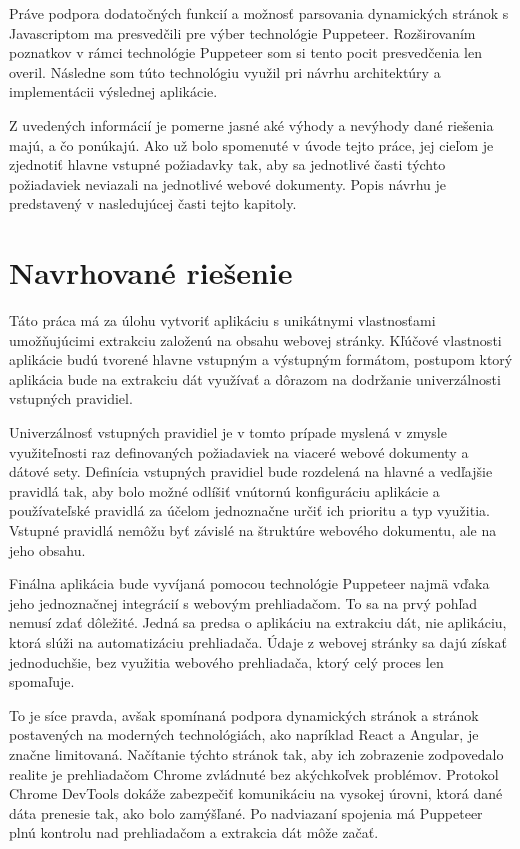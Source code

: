 Práve podpora dodatočných funkcií a možnosť parsovania dynamických stránok s Javascriptom ma presvedčili pre výber technológie Puppeteer. Rozširovaním poznatkov v rámci technológie Puppeteer som si tento pocit presvedčenia len overil. Následne som túto technológiu využil pri návrhu architektúry a implementácii výslednej aplikácie.

\bigskip

Z uvedených informácií je pomerne jasné aké výhody a nevýhody dané riešenia majú, a čo ponúkajú. Ako už bolo spomenuté v úvode tejto práce, jej cieľom je zjednotiť hlavne vstupné požiadavky tak, aby sa jednotlivé časti týchto požiadaviek neviazali na jednotlivé webové dokumenty. Popis návrhu je predstavený v nasledujúcej časti tejto kapitoly.

\newpage

\section{Navrhované riešenie}

Táto práca má za úlohu vytvoriť aplikáciu s unikátnymi vlastnosťami umožňujúcimi extrakciu založenú na obsahu webovej stránky. Kľúčové vlastnosti aplikácie budú tvorené hlavne vstupným a výstupným formátom, postupom ktorý aplikácia bude na extrakciu dát využívať a dôrazom na dodržanie univerzálnosti vstupných pravidiel. 

Univerzálnosť vstupných pravidiel je v tomto prípade myslená v zmysle využiteľnosti raz definovaných požiadaviek na viaceré webové dokumenty a dátové sety. Definícia vstupných pravidiel bude rozdelená na hlavné a vedľajšie pravidlá tak, aby bolo možné odlíšiť vnútornú konfiguráciu aplikácie a používateľské pravidlá za účelom jednoznačne určiť ich prioritu a typ využitia. Vstupné pravidlá nemôžu byť závislé na štruktúre webového dokumentu, ale na jeho obsahu.

Finálna aplikácia bude vyvíjaná pomocou technológie Puppeteer najmä vďaka jeho jednoznačnej integrácií s webovým prehliadačom. To sa na prvý pohľad nemusí zdať dôležité. Jedná sa predsa o aplikáciu na extrakciu dát, nie aplikáciu, ktorá slúži na automatizáciu prehliadača. Údaje z webovej stránky sa dajú získať jednoduchšie, bez využitia webového prehliadača, ktorý celý proces len spomaľuje. 

To je síce pravda, avšak spomínaná podpora dynamických stránok a stránok postavených na moderných technológiách, ako napríklad React a Angular, je značne limitovaná. Načítanie týchto stránok tak, aby ich zobrazenie zodpovedalo realite je prehliadačom Chrome zvládnuté bez akýchkoľvek problémov. Protokol Chrome DevTools dokáže zabezpečiť komunikáciu na vysokej úrovni, ktorá dané dáta prenesie tak, ako bolo zamýšľané. Po nadviazaní spojenia má Puppeteer plnú kontrolu nad prehliadačom a extrakcia dát môže začať. 

